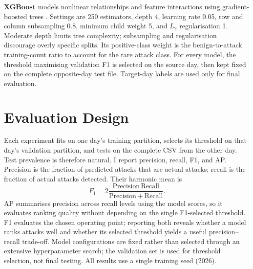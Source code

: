 \documentclass{article}
\begin{document}
\textbf{XGBoost} models nonlinear relationships and feature interactions using gradient-boosted trees \cite{chen2016}. Settings are 250 estimators, depth 4, learning rate 0.05, row and column subsampling 0.8, minimum child weight 5, and $L_2$ regularisation 1. Moderate depth limits tree complexity; subsampling and regularisation discourage overly specific splits. Its positive-class weight is the benign-to-attack training-count ratio to account for the rare attack class. For every model, the threshold maximising validation F1 is selected on the source day, then kept fixed on the complete opposite-day test file. Target-day labels are used only for final evaluation.

\section{Evaluation Design}
Each experiment fits on one day's training partition, selects its threshold on that day's validation partition, and tests on the complete CSV from the other day. Test prevalence is therefore natural. I report precision, recall, F1, and AP. Precision is the fraction of predicted attacks that are actual attacks; recall is the fraction of actual attacks detected. Their harmonic mean is
\[
F_1=2\frac{\mathrm{Precision}\,\mathrm{Recall}}{\mathrm{Precision}+\mathrm{Recall}}.
\]
AP summarises precision across recall levels using the model scores, so it evaluates ranking quality without depending on the single F1-selected threshold. F1 evaluates the chosen operating point; reporting both reveals whether a model ranks attacks well and whether its selected threshold yields a useful precision--recall trade-off. Model configurations are fixed rather than selected through an extensive hyperparameter search; the validation set is used for threshold selection, not final testing. All results use a single training seed (2026).
\end{document}
